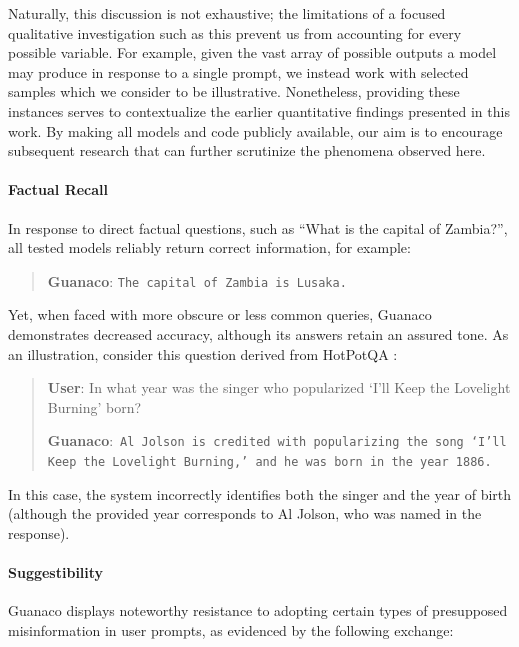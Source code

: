 Naturally, this discussion is not exhaustive; the limitations of a focused qualitative investigation such as this prevent us from accounting for every possible variable. For example, given the vast array of possible outputs a model may produce in response to a single prompt, we instead work with selected samples which we consider to be illustrative. Nonetheless, providing these instances serves to contextualize the earlier quantitative findings presented in this work. By making all models and code publicly available, our aim is to encourage subsequent research that can further scrutinize the phenomena observed here.

\paragraph{Factual Recall} In response to direct factual questions, such as ``What is the capital of Zambia?'', all tested models reliably return correct information, for example:

\begin{quote} 
    \textbf{Guanaco}:
    \texttt{The capital of Zambia is Lusaka.}
\end{quote}

Yet, when faced with more obscure or less common queries, {Guanaco} demonstrates decreased accuracy, although its answers retain an assured tone. As an illustration, consider this question derived from HotPotQA \citep{yang2018hotpotqa}:

\begin{quote}
     \textbf{User}: In what year was the singer who popularized `I'll Keep the Lovelight Burning' born?  

     \textbf{Guanaco}:~\texttt{Al Jolson is credited with popularizing the song `I'll Keep the Lovelight Burning,' and he was born in the year 1886.}
 \end{quote}

In this case, the system incorrectly identifies both the singer and the year of birth (although the provided year corresponds to Al Jolson, who was named in the response).

\paragraph{Suggestibility} {Guanaco} displays noteworthy resistance to adopting certain types of presupposed misinformation in user prompts, as evidenced by the following exchange:

